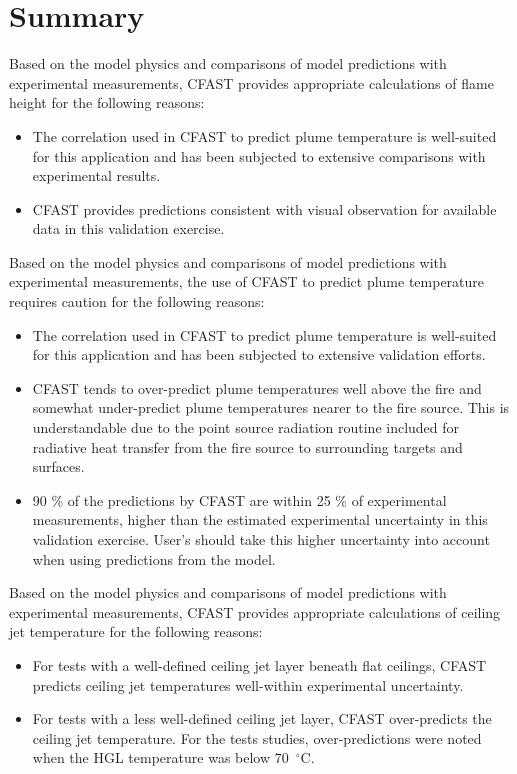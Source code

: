 \section{Summary}

Based on the model physics and comparisons of model predictions with experimental measurements, CFAST provides appropriate calculations of flame height for the following reasons:

\begin{itemize}
\item The correlation used in CFAST to predict plume temperature is well-suited for this application and has been subjected to extensive comparisons with experimental results.
\item CFAST provides predictions consistent with visual observation for available data in this validation exercise.
\end{itemize}


Based on the model physics and comparisons of model predictions with experimental measurements, the use of CFAST to predict plume temperature requires caution for the following reasons:

\begin{itemize}
\item The correlation used in CFAST to predict plume temperature is well-suited for this application and has been subjected to extensive validation efforts.
\item CFAST tends to over-predict plume temperatures well above the fire and somewhat under-predict plume temperatures nearer to the fire source.  This is understandable due to the point source radiation routine included for radiative heat transfer from the fire source to surrounding targets and surfaces.
\item 90 \% of the predictions by CFAST are within 25 \% of experimental measurements, higher than the estimated experimental uncertainty in this validation exercise.  User's should take this higher uncertainty into account when using predictions from the model.
\end{itemize}

Based on the model physics and comparisons of model predictions with experimental measurements, CFAST provides appropriate calculations of ceiling jet temperature for the following reasons:
\begin{itemize}
\item For tests with a well-defined ceiling jet layer beneath flat ceilings, CFAST predicts ceiling jet temperatures well-within experimental uncertainty.
\item For tests with a less well-defined ceiling jet layer, CFAST over-predicts the ceiling jet temperature.  For the tests studies, over-predictions were noted when the HGL temperature was below 70~$^\circ$C.
\end{itemize}

